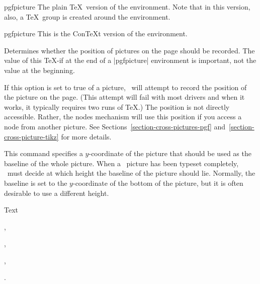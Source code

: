 \begin{plainenvironment}{{pgfpicture}}
    The plain \TeX\ version of the environment. Note that in this version,
    also, a \TeX\ group is created around the environment.
\end{plainenvironment}

\begin{contextenvironment}{{pgfpicture}}
    This is the Con\TeX t version of the environment.
\end{contextenvironment}

{\let\ifpgfrememberpicturepositiononpage=\relax
\begin{command}{\ifpgfrememberpicturepositiononpage}
    Determines whether the position of pictures on the page should be recorded.
    The value of this \TeX-if at the end of a |{pgfpicture}| environment is
    important, not the value at the beginning.

    If this option is set to true of a picture, \pgfname\ will attempt to
    record the position of the picture on the page. (This attempt will fail
    with most drivers and when it works, it typically requires two runs of
    \TeX.) The position is not directly accessible. Rather, the nodes mechanism
    will use this position if you access a node from another picture. See
    Sections~\ref{section-cross-pictures-pgf}
    and~\ref{section-cross-picture-tikz} for more details.
\end{command}
}

\makeatletter
\begin{command}{\pgfsetbaseline{}}
    This command specifies a $y$-coordinate of the picture that should be used
    as the baseline of the whole picture. When a \pgfname\ picture has been
    typeset completely, \pgfname\ must decide at which height the baseline of
    the picture should lie. Normally, the baseline is set to the $y$-coordinate
    of the bottom of the picture, but it is often desirable to use a different
    height.
\begin{codeexample}[pre={\begin{lateximage}},post={\end{lateximage}}]
Text
\begin{pgfpicture}
  \pgfpathcircle{\pgfpointorigin}{1ex}
\end{pgfpicture},
\begin{pgfpicture}
  \pgfsetbaseline{0pt}
  \pgfpathcircle{\pgfpointorigin}{1ex}
\end{pgfpicture},
\begin{pgfpicture}
  \pgfsetbaseline{.5ex}
  \pgfpathcircle{\pgfpointorigin}{1ex}
\end{pgfpicture},
\begin{pgfpicture}
  \pgfsetbaseline{-1ex}
  \pgfpathcircle{\pgfpointorigin}{1ex}
\end{pgfpicture}.
\end{codeexample}
\end{command}

